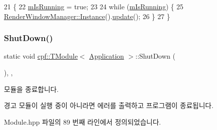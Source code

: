 \begin{DoxyCode}
21                                   \{
22         \hyperlink{classcpf_1_1_application_a84a6e2bafcc39719acee9885a064ac75}{mIsRunning} = \textcolor{keyword}{true};
23 
24         \textcolor{keywordflow}{while} (\hyperlink{classcpf_1_1_application_a84a6e2bafcc39719acee9885a064ac75}{mIsRunning}) \{
25             \hyperlink{classcpf_1_1_t_module_ac8065254584cb0a6656c42f96859d190}{RenderWindowManager::Instance}().\hyperlink{classcpf_1_1_render_window_manager_adc7ef3bd3f5c4ad9b86899adeb69b0ee}{update}();
26         \}
27     \}
\end{DoxyCode}
\mbox{\label{classcpf_1_1_t_module_a61452801c61e2546b75a7a6a545e82ee}} 
\subsubsection{\texorpdfstring{Shut\+Down()}{ShutDown()}}
{\footnotesize\ttfamily static void \hyperlink{classcpf_1_1_t_module}{cpf\+::\+T\+Module}$<$ \hyperlink{classcpf_1_1_application}{Application}  $>$\+::Shut\+Down (\begin{DoxyParamCaption}{ }\end{DoxyParamCaption})\hspace{0.3cm}{\ttfamily [inline]}, {\ttfamily [static]}, {\ttfamily [inherited]}}

모듈을 종료합니다. \begin{DoxyWarning}{경고}
모듈이 실행 중이 아니라면 에러를 출력하고 프로그램이 종료됩니다. 
\end{DoxyWarning}


Module.\+hpp 파일의 89 번째 라인에서 정의되었습니다.


